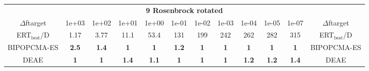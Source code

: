 \begin{tabular}{cccccccccccc}
 & \multicolumn{10}{c}{{\normalsize \textbf{9 Rosenbrock rotated}}}\\
$\Delta$ftarget& 1e+03& 1e+02& 1e+01& 1e+00& 1e-01& 1e-02& 1e-03& 1e-04& 1e-05& 1e-07 & $\Delta$ftarget \\
ERT$_{\textrm{best}}$/D& 1.17& 3.77& 11.1& 53.4& 131& 199& 242& 262& 282& 315 & ERT$_{\textrm{best}}$/D \\
\hline
BIPOPCMA-ES & \textbf{2.5} & \textbf{1.4} & \textbf{1} & \textbf{1} & \textbf{1.2} & \textbf{1} & \textbf{1} & \textbf{1} & \textbf{1} & \textbf{1} & BIPOPCMA-ES \cite{add_an_entry_for_BIPOPCMA-ES_in_bbob.bib}\\
DEAE & \textbf{1} & \textbf{1} & \textbf{1.4} & \textbf{1.1} & \textbf{1} & \textbf{1} & \textbf{1} & \textbf{1.2} & \textbf{1.2} & \textbf{1.4} & DEAE \cite{add_an_entry_for_DEAE_in_bbob.bib}
\end{tabular}
